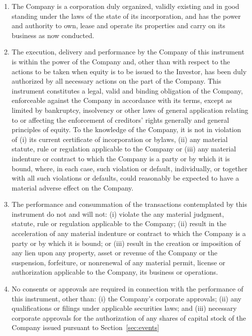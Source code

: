 \documentclass[12pt,letterpaper,fullpage]{article}
\begin{document}
\begin{enumerate}[label=(\alph*)]

\item {The Company is a corporation duly organized, validly existing
  and in good standing under the laws of the state of its
  incorporation, and has the power and authority to own, lease and
  operate its properties and carry on its business as now conducted.}

\item {\begin{sloppypar}
  The execution, delivery and performance by the Company of this
  instrument is within the power of the Company and, other than with
  respect to the actions to be taken when equity is to be issued to
  the Investor, has been duly authorized by all necessary actions on
  the part of the Company. This instrument constitutes a legal, valid
  and binding obligation of the Company, enforceable against the
  Company in accordance with its terms, except as limited by
  bankruptcy, insolvency or other laws of general application relating
  to or affecting the enforcement of creditors’ rights generally and
  general principles of equity.  To the knowledge of the Company, it
  is not in violation of (i) its current certificate of incorporation
  or bylaws, (ii) any material statute, rule or regulation applicable
  to the Company or (iii) any material indenture or contract to which
  the Company is a party or by which it is bound, where, in each case,
  such violation or default, individually, or together with all such
  violations or defaults, could reasonably be expected to have a
  material adverse effect on the Company.\end{sloppypar}}

\item {\begin{sloppypar}The performance and consummation of the transactions
  contemplated by this instrument do not and will not: (i) violate the
  any material judgment, statute, rule or regulation applicable to the
  Company; (ii) result in the acceleration of any material indenture
  or contract to which the Company is a party or by which it is bound;
  or (iii) result in the creation or imposition of any lien upon any
  property, asset or revenue of the Company or the suspension,
  forfeiture, or nonrenewal of any material permit, license or
  authorization applicable to the Company, its business or
  operations.\end{sloppypar}}

\item {No consents or approvals are required in connection with the
    performance of this instrument, other than: (i) the Company’s
    corporate approvals; (ii) any qualifications or filings under
    applicable securities laws; and (iii) necessary corporate
    approvals for the authorization of any shares of capital stock of
    the Company issued pursuant to Section~\ref{sec:events}}


\end{enumerate}
\end{document}
